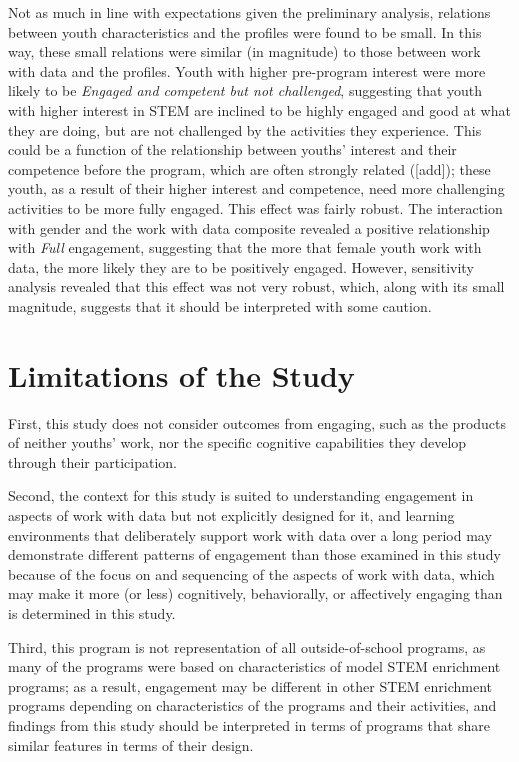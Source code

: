 \documentclass[]{msu-thesis}
\theoremstyle{definition}
\theoremstyle{definition}
\theoremstyle{definition}
\theoremstyle{remark}
\begin{document}
Not as much in line with expectations given the preliminary analysis,
relations between youth characteristics and the profiles were found to
be small. In this way, these small relations were similar (in magnitude)
to those between work with data and the profiles. Youth with higher
pre-program interest were more likely to be \emph{Engaged and competent
but not challenged}, suggesting that youth with higher interest in STEM
are inclined to be highly engaged and good at what they are doing, but
are not challenged by the activities they experience. This could be a
function of the relationship between youths' interest and their
competence before the program, which are often strongly related
({[}add{]}); these youth, as a result of their higher interest and
competence, need more challenging activities to be more fully engaged.
This effect was fairly robust. The interaction with gender and the work
with data composite revealed a positive relationship with \emph{Full}
engagement, suggesting that the more that female youth work with data,
the more likely they are to be positively engaged. However, sensitivity
analysis revealed that this effect was not very robust, which, along
with its small magnitude, suggests that it should be interpreted with
some caution.

\section{Limitations of the Study}\label{limitations-of-the-study}

First, this study does not consider outcomes from engaging, such as the
products of neither youths' work, nor the specific cognitive
capabilities they develop through their participation.

Second, the context for this study is suited to understanding engagement
in aspects of work with data but not explicitly designed for it, and
learning environments that deliberately support work with data over a
long period may demonstrate different patterns of engagement than those
examined in this study because of the focus on and sequencing of the
aspects of work with data, which may make it more (or less) cognitively,
behaviorally, or affectively engaging than is determined in this study.

Third, this program is not representation of all outside-of-school
programs, as many of the programs were based on characteristics of model
STEM enrichment programs; as a result, engagement may be different in
other STEM enrichment programs depending on characteristics of the
programs and their activities, and findings from this study should be
interpreted in terms of programs that share similar features in terms of
their design.
\end{document}
